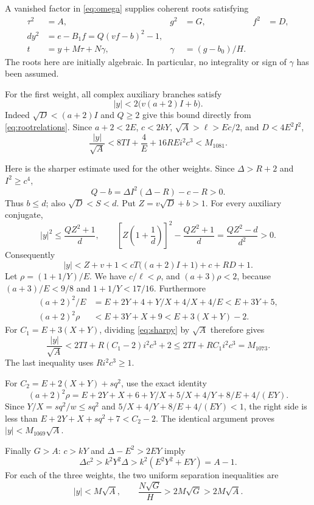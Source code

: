 A vanished factor in \eqref{eq:omega} supplies coherent roots satisfying
\begin{align}
 \tau^2&=A,&g^2&=G,&f^2&=D,\nonumber\\
 d y^2&=e-B_1f=Q(vf-b)^2-1,\label{eq:rootrelations}\\
 t&=y+M\tau+N\gamma,&\gamma&=(g-b_0)/H.
 \label{eq:linearroot}
\end{align}
The roots here are initially algebraic. In particular, no integrality
or sign of $\gamma$ has been assumed.

For the first weight, all complex auxiliary branches satisfy
\[
 |y|<2\bigl(v(a+2)I+b\bigr).
\]
Indeed $\sqrt D<(a+2)I$ and $Q\ge2$ give this bound directly from
\eqref{eq:rootrelations}. Since
$a+2<2E$, $c<2kY$, $\sqrt A>\ell>Ec/2$, and $D<4E^2I^2$,
\[
 \frac{|y|}{\sqrt A}
 <8TI+\frac4E+16REi^2c^3<M_{1081}.
\]

Here is the sharper estimate used for the other weights.
Since $\Delta>R+2$ and $I^2\ge c^4$,
\[
 Q-b=\Delta I^2(\Delta-R)-c-R>0.
\]
Thus $b\le d$; also $\sqrt D<S<d$.
Put $Z=v\sqrt D+b>1$. For every auxiliary conjugate,
\[
 |y|^2\le\frac{QZ^2+1}{d},\qquad
 \left[Z\left(1+\frac1d\right)\right]^2-
       \frac{QZ^2+1}{d}=\frac{QZ^2-d}{d^2}>0.
\]
Consequently
\begin{equation}
 |y|<Z+v+1<cT\bigl((a+2)I+1\bigr)+c+RD+1.
 \label{eq:sharpy}
\end{equation}
Let $\rho=(1+1/Y)/E$. We have $c/\ell<\rho$, and
$(a+3)\rho<2$, because
$(a+3)/E<9/8$ and $1+1/Y<17/16$.
Furthermore
\begin{align*}
 (a+2)^2/E&=E+2Y+4+Y/X+4/X+4/E<E+3Y+5,\\
 (a+2)^2\rho&<E+3Y+X+9<E+3(X+Y)-2.
\end{align*}
For $C_1=E+3(X+Y)$, dividing \eqref{eq:sharpy} by $\sqrt A$
therefore gives
\[
 \frac{|y|}{\sqrt A}
 <2TI+R(C_1-2)i^2c^3+2
 \le 2TI+RC_1i^2c^3=M_{1073}.
\]
The last inequality uses $Ri^2c^3\ge1$.

For $C_2=E+2(X+Y)+sq^2$, use the exact identity
\[
 (a+2)^2\rho=E+2Y+X+6+Y/X+5/X+4/Y+8/E+4/(EY).
\]
Since $Y/X=sq^2/w\le sq^2$ and
$5/X+4/Y+8/E+4/(EY)<1$, the right side is less than
$E+2Y+X+sq^2+7<C_2-2$. The identical argument proves
$|y|<M_{1069}\sqrt A$.

Finally $G>A$: $c>kY$ and $\Delta-E^2>2EY$ imply
\[
 \Delta c^2>k^2Y^2\Delta>
 k^2(E^2Y^2+EY)=A-1.
\]
For each of the three weights, the two uniform separation inequalities are
\begin{equation}
 |y|<M\sqrt A,\qquad
 \frac{N\sqrt G}{H}>2M\sqrt G>2M\sqrt A.
 \label{eq:separate}
\end{equation}

